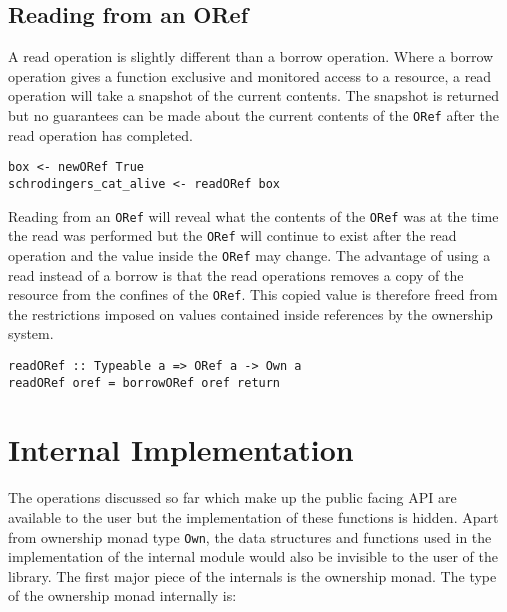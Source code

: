 \documentclass[onehalf,11pt]{beavtex}
\begin{document}




\subsection{Reading from an ORef}

A read operation is slightly different than a borrow operation. Where a borrow
operation gives a function exclusive and monitored access to a resource, a read
operation will take a snapshot of the current contents. The snapshot is returned
but no guarantees can be made about the current contents of the \texttt{ORef}
after the read operation has completed.

\begin{verbatim}
box <- newORef True
schrodingers_cat_alive <- readORef box
\end{verbatim}

Reading from an \texttt{ORef} will reveal what the contents of the \texttt{ORef}
was at the time the read was performed but the \texttt{ORef} will continue to
exist after the read operation and the value inside the \texttt{ORef} may change.
The advantage of using a read instead of a borrow is that the read operations
removes a copy of the resource from the confines of the \texttt{ORef}.
This copied value is therefore freed from the restrictions imposed on values
contained inside references by the ownership system.

\begin{verbatim}
readORef :: Typeable a => ORef a -> Own a
readORef oref = borrowORef oref return
\end{verbatim}

\section{Internal Implementation}

The operations discussed so far which make up the public facing API are
available to the user but the implementation of these functions is hidden.
Apart from ownership monad type \texttt{Own},
the data structures and functions used in the implementation of the internal
module would also be invisible to the user of the library. The first major
piece of the internals is the ownership monad. The type of the ownership monad
internally is:
\end{document}
